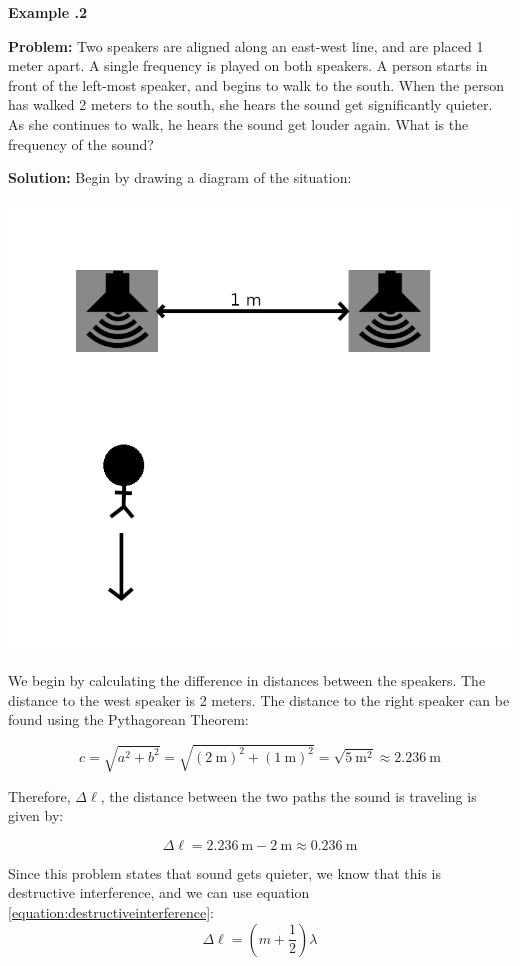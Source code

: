 	
\begin{mdframed}[backgroundcolor=blue!10!white]
		\begin{center}
			
			
			\textbf{Example \thesection.2}	
		\end{center}
		
		\textbf{Problem: } Two speakers are aligned along an east-west line, and are placed 1 meter apart.  A single frequency is played on both speakers.  A person starts in front of the left-most speaker, and begins to walk to the south.  When the person has walked 2 meters to the south, she hears the sound get significantly quieter.  As she continues to walk, he hears the sound get louder again.  What is the frequency of the sound?
		\vspace{0.2in}
		

		
	
		
		\textbf{Solution:} 
		Begin by drawing a diagram of the situation: 
		
		\begin{center}
		\includegraphics[height=1.5 in]{Chapters/Ch10-Waves/speakers.png}
		\end{center}
	
		We begin by calculating the difference in distances between the speakers.  The distance to the west speaker is 2 meters.  The distance to the right speaker can be found using the Pythagorean Theorem:
		
		\begin{equation*}
		c = \sqrt{a^2 + b^2} = \sqrt{(\SI{2}{\m})^2 + (\SI{1}{\m})^2} = \sqrt{\SI{5}{\m^2 }} \approx \SI{2.236}{\m}
		\end{equation*}
		
		Therefore, $\Delta \ell$, the distance between the two paths the sound is traveling is given by: 
		
		\begin{equation*}
		\Delta \ell = \SI{2.236}{\m} - \SI{2}{\m} \approx \SI{0.236}{\m}
		\end{equation*}
	
		Since this problem states that sound gets quieter, we know that this is destructive interference, and we can use equation \ref{equation:destructiveinterference}:  
		\begin{equation*}
		\Delta \ell = (m+\frac{1}{2}) \lambda
		\end{equation*}
		

\end{mdframed}
